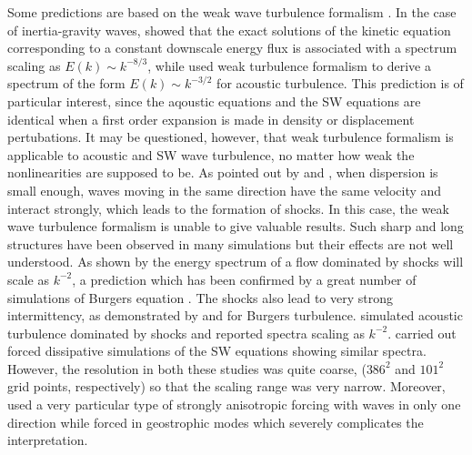 \documentclass{jfm}
\begin{document}
Some predictions are based on the weak wave turbulence formalism
\cite[]{ZakharovLvovFalkovich1992, Nazarenko2011}.  In the case of
inertia-gravity waves, \cite{FalkovichMedvedev1992} showed that the
exact solutions of the kinetic equation corresponding to a constant
downscale energy flux is associated with a spectrum scaling as $E(k)
\sim  k^{-8/3}$, while \cite{ZakharovSagdeev1970} 
used weak turbulence formalism to derive a spectrum of the form $ E(k) \sim  k^{-3/2} $ for acoustic turbulence. This prediction is of particular interest, since the aqoustic equations and the SW equations are identical when a first order expansion is made in
density or displacement pertubations. It may be questioned, however,  that weak turbulence formalism is applicable to acoustic and SW wave turbulence, no matter how weak the nonlinearities are supposed to be. As pointed out by \cite{KadomtsevPet1970} and 
\cite{FalkovichMeyer1996}, when dispersion is small enough, waves moving in the same direction have
the same velocity and interact strongly, which leads to the
formation of shocks.  In this case, the weak wave turbulence
formalism is unable to give valuable results.  Such sharp and long
structures have been observed in many simulations
\cite[]{FargeSadourny1989, PolvaniMcWilliamsSpallFord1994,
LahayeZeitlin2012} but their effects are not well understood.
%
As shown by \cite{Burgers1948} the energy spectrum of a flow dominated by shocks will scale as $ k^{-2} $, a 
 prediction which has been confirmed by a great number of simulations of Burgers equation \cite[for a review, see ] []{Frisch2001}.
 The shocks also lead to very strong intermittency, as demonstrated by
\cite{BouchaudMezardParisi1995} and \cite{WeinanKhaninMazelSinai1997}
for Burgers turbulence.
%
\cite{FalkovichMeyer1996} simulated acoustic turbulence dominated by shocks 
and reported spectra scaling as $ k^{-2} $.
\cite{YuanHamilton1994} carried out
forced dissipative simulations of the SW equations showing similar spectra. 
However, the resolution in both these studies was quite coarse, ($386^2$
and $101^2$ grid points, respectively) so that the scaling range was very
narrow.  Moreover, \cite{FalkovichMeyer1996} used a very particular
type of strongly anisotropic forcing with waves in only one
direction while \cite{YuanHamilton1994} forced in geostrophic modes
which severely complicates the interpretation.
\end{document}
